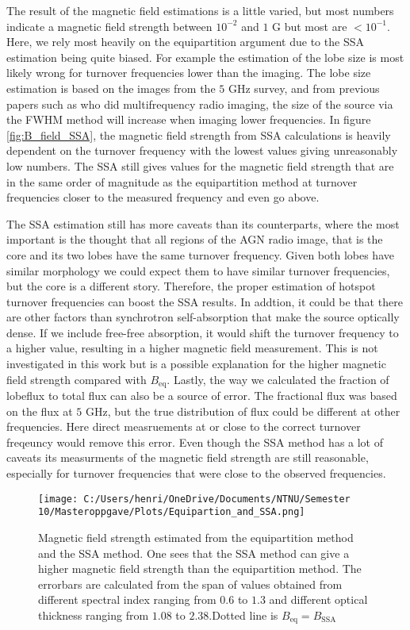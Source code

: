 The result of the magnetic field estimations is a little varied, but  most  numbers indicate a magnetic field strength between $ 10^{-2}$ and $1$ G but most are $<10^{-1}$. Here, we rely most heavily on the equipartition argument due to the SSA estimation being quite biased. For example the estimation of the lobe size is most likely wrong for turnover frequencies lower than the imaging. The lobe size estimation is based on the images from the $5$ GHz survey, and from previous papers such as \cite{Marr_2013} who did multifrequency radio imaging, the size of the source via the FWHM method will increase when imaging lower frequencies. In figure \ref{fig:B_field_SSA}, the magnetic field strength from SSA calculations is heavily dependent on the turnover frequency with the lowest values giving unreasonably low numbers. The SSA still gives values for the magnetic field strength that are in the same order of magnitude as the equipartition method at turnover frequencies closer to the measured frequency and even go above.

The SSA estimation still has more caveats than its counterparts, where the most important is the thought that all regions of the AGN radio image, that is the core and its two lobes have the same turnover frequency. Given both lobes have similar morphology we could expect them to have similar turnover frequencies, but the core is a different story. Therefore, the proper estimation of hotspot turnover frequencies can boost the SSA results. In addtion, it could be that there are other factors than synchrotron self-absorption that make the source optically dense. If we include free-free absorption, it would shift the turnover frequency to a higher value, resulting in a higher magnetic field measurement. This is not investigated in this work but is a possible explanation for the higher magnetic field strength compared with $B_{\text{eq}}$. Lastly, the way we calculated the fraction of lobeflux to total flux can also be a source of error. The fractional flux was based on the flux at $5$ GHz, but the true distribution of flux could be different at other frequencies. Here direct measruements at or close to the correct turnover freqeuncy would remove this error.  Even though the SSA method has a lot of caveats its measurments of the magnetic field strength are still reasonable, especially for turnover frequencies that were close to the observed frequencies.

\begin{figure}
    \centering
    \texttt{[image: C:/Users/henri/OneDrive/Documents/NTNU/Semester 10/Masteroppgave/Plots/Equipartion\_and\_SSA.png]}
    \caption{Magnetic field strength estimated from the equipartition method and the SSA method. One sees that the SSA method can give a higher magnetic field strength than the equipartition method. The errorbars are calculated from the span of values obtained from different spectral index ranging from $0.6$ to $1.3$ and different optical thickness ranging from $1.08$ to $2.38$.Dotted line is $B_{\text{eq}} = B_{\text{SSA}}$}
    \label{fig:B_field_both}
\end{figure}


